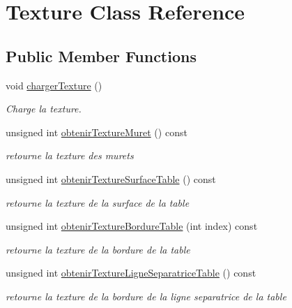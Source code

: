 \hypertarget{class_texture}{}\section{Texture Class Reference}
\label{class_texture}
\subsection*{Public Member Functions}
\begin{DoxyCompactItemize}
\item 
void \hyperlink{group__inf2990_gac2b173a88bb31605ada337fa22d0bfe1}{charger\+Texture} ()
\begin{DoxyCompactList}\small\item\em Charge la texture. \end{DoxyCompactList}\item 
unsigned int \hyperlink{group__inf2990_ga4e22a8ce908821c530b079573664029d}{obtenir\+Texture\+Muret} () const 
\begin{DoxyCompactList}\small\item\em retourne la texture des murets \end{DoxyCompactList}\item 
unsigned int \hyperlink{group__inf2990_gac3447011242cd85ed04c6b71d7643816}{obtenir\+Texture\+Surface\+Table} () const 
\begin{DoxyCompactList}\small\item\em retourne la texture de la surface de la table \end{DoxyCompactList}\item 
unsigned int \hyperlink{group__inf2990_ga20ed263c949a2e8ebc1577b89705417f}{obtenir\+Texture\+Bordure\+Table} (int index) const 
\begin{DoxyCompactList}\small\item\em retourne la texture de la bordure de la table \end{DoxyCompactList}\item 
unsigned int \hyperlink{group__inf2990_ga6ad6aa8dca7aae97ac507e5d2ce2646b}{obtenir\+Texture\+Ligne\+Separatrice\+Table} () const 
\begin{DoxyCompactList}\small\item\em retourne la texture de la bordure de la ligne separatrice de la table \end{DoxyCompactList}\end{DoxyCompactItemize}
